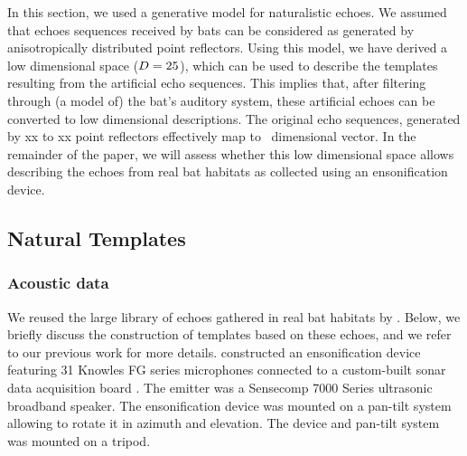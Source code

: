 \documentclass[preprint,5p]{elsarticle}
\begin{document}
In this section, we  used a generative model for naturalistic echoes. We assumed that echoes sequences received by bats can be considered as generated by anisotropically distributed point reflectors. Using this model, we have derived a low dimensional space ($D = 25$), which can be used to describe the templates resulting from the artificial echo sequences. This implies that, after filtering through (a model of) the bat's auditory system, these artificial echoes can be converted to low dimensional descriptions. The original echo sequences, generated by xx to xx point reflectors effectively map to \pca\ dimensional vector. In the remainder of the paper, we will assess whether this low dimensional space allows describing the echoes from real bat habitats as collected using an ensonification device.

\subsection{Natural Templates}

\subsubsection{Acoustic data}

We reused the large library of echoes gathered in real bat habitats by \citet{Vanderelst2016}. Below, we briefly discuss the construction of templates based on these echoes, and we refer to our previous work for more details. \citet{Vanderelst2016} constructed an ensonification device featuring 31 Knowles FG series microphones connected to a custom-built sonar data acquisition board \citep{Steckel2013a}. The emitter was a Sensecomp 7000 Series ultrasonic broadband speaker. The ensonification device was mounted on a pan-tilt system allowing to rotate it in azimuth and elevation. The device and pan-tilt system was mounted on a tripod.
\end{document}
